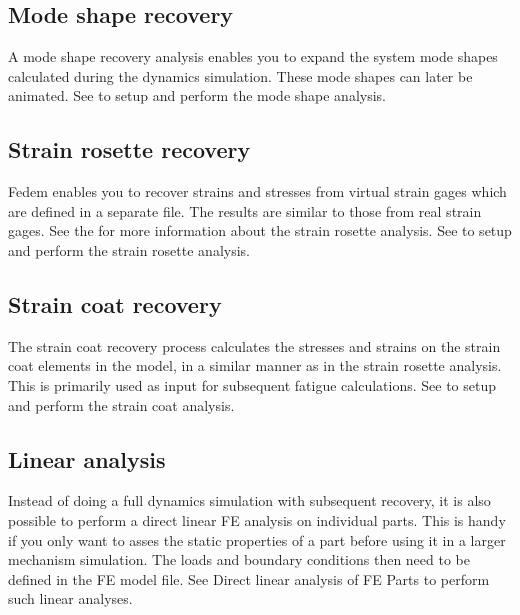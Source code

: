 \clearpage


\subsection{Mode shape recovery}

A mode shape recovery analysis enables you to expand the system mode shapes
calculated during the dynamics simulation.
These mode shapes can later be animated.
See 
to setup and perform the mode shape analysis.


\subsection{Strain rosette recovery}

Fedem enables you to recover strains and stresses from virtual strain gages
which are defined in a separate file.
The results are similar to those from real strain gages.
See the 
for more information about the strain rosette analysis.
See 
to setup and perform the strain rosette analysis.


\subsection{Strain coat recovery}

The strain coat recovery process calculates the stresses and strains
on the strain coat elements in the model,
in a similar manner as in the strain rosette analysis.
This is primarily used as input for subsequent fatigue calculations.
See 
to setup and perform the strain coat analysis.


\subsection{Linear analysis}

Instead of doing a full dynamics simulation with subsequent recovery,
it is also possible to perform a direct linear FE analysis on individual parts.
This is handy if you only want to asses the static properties of a part before
using it in a larger mechanism simulation.
The loads and boundary conditions then need to be defined in the FE model file.
See 
{Direct linear analysis of FE Parts} to perform such linear analyses.


